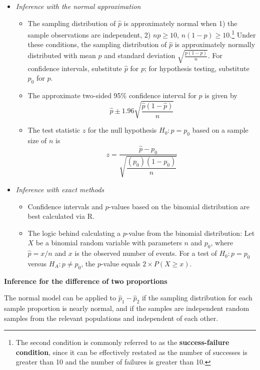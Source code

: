 \documentclass[letterpaper,12pt,twoside,]{pinp}
\begin{document}
\begin{itemize}
\item
  \emph{Inference with the normal approximation}

  \begin{itemize}
  \item
    The sampling distribution of \(\hat{p}\) is approximately normal
    when 1) the sample observations are independent, 2) \(np \geq 10\),
    \(n(1 - p) \geq 10\).\footnote{The second condition is commonly referred to as the \textbf{success-failure condition}, since it can be effectively restated as the number of successes is greater than 10 and the number of failures is greater than 10.}
    Under these conditions, the sampling distribution of \(\hat{p}\) is
    approximately normally distributed with mean \(p\) and standard
    deviation \(\sqrt{\frac{p(1-p)}{n}}\). For confidence intervals,
    substitute \(\hat{p}\) for \(p\); for hypothesis testing, substitute
    \(p_0\) for \(p\).
  \item
    The approximate two-sided 95\% confidence interval for \(p\) is
    given by \[\hat{p} \pm 1.96 \sqrt{\dfrac{\hat{p}(1 - \hat{p})}{n}}\]
  \item
    The test statistic \(z\) for the null hypothesis \(H_0: p = p_0\)
    based on a sample size of \(n\) is
    \[z = \dfrac{\hat{p} - p_0}{\sqrt{\dfrac{(p_0)(1-p_0)}{n}}} \]
  \end{itemize}
\item
  \emph{Inference with exact methods}

  \begin{itemize}
  \item
    Confidence intervals and \(p\)-values based on the binomial
    distribution are best calculated via \textsf{R}.
  \item
    The logic behind calculating a \(p\)-value from the binomial
    distribution: Let \(X\) be a binomial random variable with
    parameters \(n\) and \(p_0\), where \(\hat{p} = x/n\) and \(x\) is
    the observed number of events. For a test of \(H_0: p = p_0\) versus
    \(H_A: p \neq p_0\), the \(p\)-value equals
    \(2 \times P(X \geq x)\).
  \end{itemize}
\end{itemize}

\textbf{Inference for the difference of two proportions}

The normal model can be applied to \(\hat{p}_1 - \hat{p}_2\) if the
sampling distribution for each sample proportion is nearly normal, and
if the samples are independent random samples from the relevant
populations and independent of each other.
\end{document}
